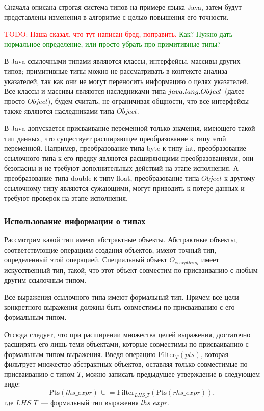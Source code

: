 \documentclass[14pt,titlepage]{extarticle}
\newcommand{\Pts}[1]{\textrm{Pts}(#1)}
\newcommand{\Filter}[2]{\textrm{Filter}_{#1}(#2)}
\newcommand{\cupe}{\,\cup\!\!=}
\newcommand{\remark}[1]{\textcolor{Green}{#1}}
\newcommand{\todo}[1]{\textcolor{red}{\eng{TODO}: #1}}
\newcommand{\eng}[1]{{\English#1}}
\begin{document}
      Сначала описана строгая система типов на примере языка Java, затем будут
      представлены изменения в алгоритме с целью повышения его точности.

      \todo{Паша сказал, что тут написан бред, поправить.}
      \remark{Как? Нужно дать нормальное определение, или просто убрать
      про примитивные типы?}

      В Java ссылочными типами являются классы, интерфейсы, массивы других
      типов; примитивные типы можно не рассматривать в контексте анализа
      указателей, так как они не могут переносить информацию о целях
      указателей. Все классы и массивы являются наследниками типа
      $java.\-lang.\-Object$ (далее просто $Object$), будем считать,
      не ограничивая общности, что все интерфейсы также являются
      наследниками типа $Object$.

      В Java допускается присваивание переменной только значения, имеющего
      такой тип данных, что существует расширяющее преобразование к типу этой
      переменной.
      Например, преобразование типа byte к типу int, преобразование ссылочного
      типа к его предку являются расширяющими преобразованиями, они безопасны и
      не требуют дополнительных действий на этапе исполнения.
      А преобразование типа double к типу float, преобразование типа $Object$ к
      другому ссылочному типу являются сужающими, могут приводить к потере
      данных и требуют проверок на этапе исполнения.

      \subsubsection{Использование информации о типах}

        Рассмотрим какой тип имеют абстрактные объекты. Абстрактные объекты,
        соответствующие операциям создания объектов, имеют точный тип,
        определенный этой операцией.
        Специальный объект $O_{everything}$ имеет искусственный тип, такой, что
        этот объект совместим по присваиванию с любым другим ссылочным типом.

        Все выражения ссылочного типа имеют формальный тип. Причем все цели
        конкретного выражения должны быть совместимы по присваиванию с его
        формальным типом.

        Отсюда следует, что при расширении множества целей выражения, достаточно
        расширять его лишь теми объектами, которые совместимы по присваиванию с
        формальным типом выражения.
        Введя операцию $\Filter{T}{pts}$, которая фильтрует множество
        абстрактных объектов, оставляя только совместимые по присваиванию с типом
        $T$, можно записать предыдущее утверждение в следующем виде:
        \[\Pts{lhs\_expr} \cupe \Filter{LHS\_T}{\Pts{rhs\_expr}},\]
        где $LHS\_T$~--- формальный тип выражения $lhs\_expr$.
\end{document}
